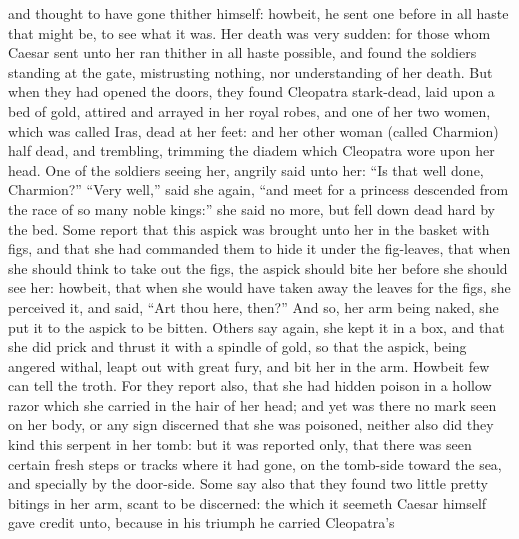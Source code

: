 \documentclass{book}
\begin{document}
and thought to have gone thither himself: howbeit, he sent one before in all
haste that might be, to see what it was. 
Her   death was very sudden: for those whom Caesar
sent unto her ran thither in all haste possible, and found the soldiers
standing at the gate, mistrusting nothing, nor understanding of her death. 
But   when they had opened the
doors, they found Cleopatra stark-dead, laid upon a bed of gold, attired and
arrayed in her royal robes, and one of her two women, which was called Iras,
dead at her feet: and her other woman (called Charmion) half dead, and
trembling, trimming the diadem which Cleopatra wore upon her head. One of the
soldiers seeing her, angrily said unto her: ``Is that well done, Charmion?''
``Very well,'' said she again, ``and meet for a princess descended from the race
of so many noble kings:'' she said no more, but fell down dead hard by the
bed. 
Some report that this aspick was brought unto her in the basket
with figs, and that she had commanded them to hide it under the fig-leaves,
that when she should think to take out the figs, the aspick should bite her 
before she should see her: howbeit, that when she would have taken
away the leaves for the figs, she perceived it, and said, ``Art thou here,
then?''
And  so, her arm being naked,
she put it to the aspick to be bitten. Others say again, she kept it in a box,
and that she did prick and thrust it with a spindle of gold, so that the
aspick, being angered withal, leapt out with great fury, and bit her in the
arm.
Howbeit few can tell the troth. For they report also, that she had
hidden poison in a hollow razor which she carried in the hair of her head; and
yet was there no mark seen on her body, or any sign discerned that she was
poisoned, neither also did they kind this serpent in her tomb: but it was
reported only, that there was seen certain fresh steps or tracks where it had
gone, on the tomb-side toward the sea, and specially by the door-side. Some
say also that they found two little pretty bitings in her arm, scant
to be discerned: the which it seemeth Caesar himself gave credit unto, because
in his triumph he carried Cleopatra's  
\end{document}
